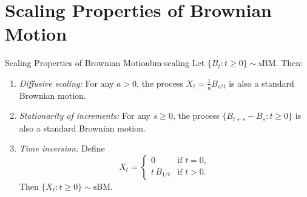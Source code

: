 \section{Scaling Properties of Brownian Motion}

\begin{theorem}{Scaling Properties of Brownian Motion}{bm-scaling}
    Let $\{B_t : t \geq 0\} \sim \mathrm{sBM}$. Then:
    \begin{enumerate}[label=(\roman*)]
        \item \emph{Diffusive scaling:} For any $a > 0$, the process $X_t = \frac{1}{a} B_{a^2 t}$ is also a standard Brownian motion.
        \item \emph{Stationarity of increments:} For any $s \geq 0$, the process $\{B_{t+s} - B_s : t \geq 0\}$ is also a standard Brownian motion.
        \item \emph{Time inversion:} Define
        \[
            X_t =
            \begin{cases}
                0 & \text{if } t = 0,\\
                t\, B_{1/t} & \text{if } t > 0.
            \end{cases}
        \]
        Then $\{X_t : t \geq 0\} \sim \mathrm{sBM}$.
    \end{enumerate}
\end{theorem}

